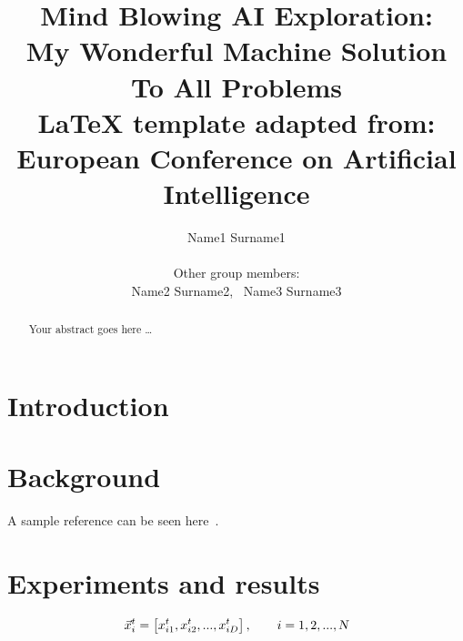 \documentclass{COMPXXXX}
\begin{document}
\title{Mind Blowing AI Exploration:\\
	My Wonderful Machine Solution To All Problems \\
	\small \LaTeX \hspace{1mm} template adapted from: \\
	European Conference on Artificial Intelligence}

\author{Name1 Surname1\\ \\
	Other group members:\\
		Name2 Surname2,~
		Name3 Surname3
	 }

\maketitle


\begin{abstract}
Your abstract goes here \dots 
\lipsum[1-2]
\end{abstract}


\section{Introduction}

\lipsum[3]

\section{Background}
\lipsum[4-5]


A sample reference can be seen here~\cite{Kennedy_James_Eberhart_2001}.

\section{Experiments and results}
\lipsum[6-7]

\begin{equation}
\vec{x}_{i}^{t} = \left[x_{i1}^{t}, x_{i2}^{t}, ..., x_{iD}^{t}\right],\qquad 
i = 1,2,...,\textsl{N}
\end{equation}
\end{document}
